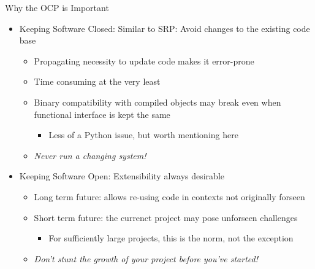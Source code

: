 \begin{frame}{Why the OCP is Important}
%
\begin{itemize}
\item Keeping Software Closed: Similar to SRP: Avoid changes to the existing code base
	\begin{itemize}
	\item Propagating necessity to update code makes it error-prone
	\item Time consuming at the very least
	\item Binary compatibility with compiled objects may break even when functional interface is kept the same
		\begin{itemize}
		\item Less of a Python issue, but worth mentioning here
		\end{itemize}
	\item[\Thus] \emph{Never run a changing system!}
	\end{itemize}
\item Keeping Software Open: Extensibility always desirable
	\begin{itemize}
	\item Long term future: allows re-using code in contexts not originally forseen
	\item Short term future: the currenct project may pose unforseen challenges
		\begin{itemize}
		\item For sufficiently large projects, this is the norm, not the exception
		\end{itemize}
	\item[\Thus] \emph{Don't stunt the growth of your project before you've started!}
	\end{itemize}
\end{itemize}
%
\end{frame}


